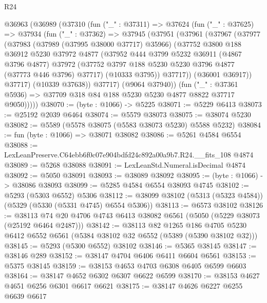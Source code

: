 \begin{lexlean}{R24}
\begin{coremodule}
  @36963
    (@36989
      (@37310
        (fun ("_" : @37311) =>
        @37624
          (fun ("_" : @37625) =>
          @37934
            (fun ("_" : @37362) =>
            @37945
              (@37951
                (@37961
                  (@37967
                    (@37977
                      (@37983
                        (@37989 (@37995 @38000 @37717) @35966)
                        (@37752
                          @3800
                          @188
                          @36912
                          @5230
                          @37972
                          @4877
                          (@37952
                            @444
                            @3799
                            @5232
                            @36911
                            (@4867 @3796 @4877)
                            @37972
                            (@37752 @3797 @188 @5230 @5230 @3796 @4877 (@37773 @446 @3796) @37717)
                            (@10333 @3795))
                          @37717))
                      (@36001 @36917))
                    @37717)
                  (@10339 @37638))
                @37717)
              (@9064 @37940))
            (fun ("_" : @37361 @5936) =>
            @37709 @318 @84 @188 @5230 @5230 @4877 @8822 @37717 @9050)))))
@38070 := (byte : @1066) -> @5225
@38071 := @5229 @6413
@38073 := @25192 @2039 @6464
@38074 := @5579 @38073
@38075 := @38074 @5230
@38082 := @5589 (@5578 @38075 (@5583 @38073 @5230) @5588 @5232)
@38084 := fun (byte : @1066) => @38071 @38082
@38086 := @5261 @4584 @6554
@38088 := LexLeanPreserve.C64ebb6f0c07e904bdfd24c892a00a9b7.R24.__fits_108 @4874
@38089 := @5268 @38088
@38091 := LexLeanStd.Numeral.isDecimal @4874
@38092 := @5050 @38091
@38093 := @38089 @38092
@38095 := (byte : @1066) -> @38086 @38093
@38099 := @5285 @4584 @6554 @38093 @4745
@38102 := @5293 (@5303 @6552) @5306
@38112 := @38099 @38102 (@5313 (@5323 @4584)) (@5329 (@5330 (@5331 @4745) @6554 @5306))
@38113 := @6573 @38102
@38126 := @38113 @74 @20 @4706 @4743 @6413 @38082 @6561 (@5050 (@5229 @38073 (@25192 @6464 @2487)))
@38142 := @38113
    @82
    @1265
    @186
    @4705
    @5230
    @6412
    @6552
    @6561
    (@5384 @38102 @32 @6552 (@5389 (@5390 @38102 @32)))
@38145 := @5293 (@5300 @6552) @38102
@38146 := @5365 @38145
@38147 := @38146 @289
@38152 := @38147 @4704 @6406 @6411 @6604 @6561
@38153 := @5375 @38145
@38159 := @38153 @4653 @4703 @6308 @6405 @6599 @6603
@38164 := @38147 @4652 @6302 @6307 @6622 @6599
@38170 := @38153 @4627 @4651 @6256 @6301 @6617 @6621
@38175 := @38147 @4626 @6227 @6255 @6639 @6617

\end{coremodule}
\end{lexlean}
